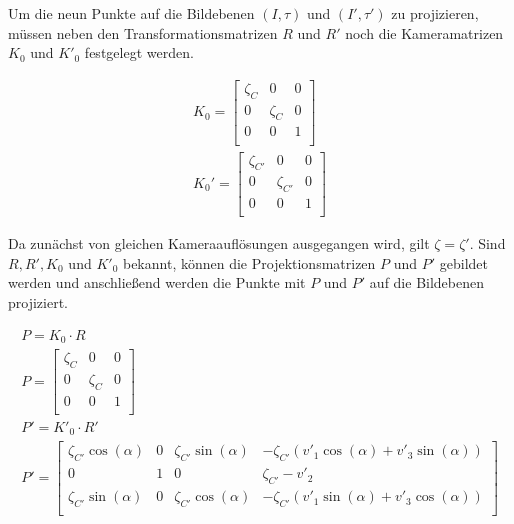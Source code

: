 
Um die neun Punkte auf die Bildebenen $(I,\tau)$ und $(I',\tau')$ zu projizieren, müssen neben den Transformationsmatrizen $R$ und $R'$ noch die Kameramatrizen $K_0$ und $K'_0$ festgelegt werden.


\begin{gather}		
K_0 =
\begin{bmatrix}
\zeta_{C}&0&0\\
0&\zeta_{C}&0\\
0&0&1\\
\end{bmatrix}\label{eq:eq4.9}\\
K_0' =
\begin{bmatrix}
\zeta_{C'}&0&0\\
0&\zeta_{C'}&0\\
0&0&1\\
\end{bmatrix}\label{eq:eq4.10}
\end{gather}

Da zunächst von gleichen Kameraauflösungen ausgegangen wird, gilt $\zeta = \zeta'$. Sind $R,R',K_0$ und $K'_0$ bekannt, können die Projektionsmatrizen $P$ und $P'$ gebildet werden und anschließend werden die Punkte mit $P$ und $P'$ auf die Bildebenen projiziert.


\begin{gather}
P = K_0\cdot R \\
P =
\begin{bmatrix}
\zeta_{C}&0&0\\
0&\zeta_{C}&0\\
0&0&1\\
\end{bmatrix}\\
P' = K'_0 \cdot R'\\
P' =
\begin{bmatrix}
\zeta_{C'} \cos(\alpha)&0&\zeta_{C'} \sin(\alpha)&-\zeta_{C'} (v'_1\cos(\alpha)+v'_3\sin(\alpha) )\\
0&1&0&\zeta_{C'}-v'_2\\
\zeta_{C'}\sin(\alpha)&0&\zeta_{C'}\cos(\alpha)&-\zeta_{C'}(v'_1\sin(\alpha)+v'_3\cos(\alpha))\\
\end{bmatrix}
\end{gather}



